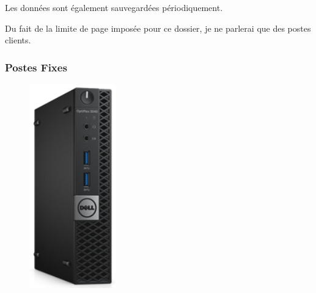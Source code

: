 \documentclass[11pt,a4paper,oneside]{article}
\begin{document}
Les données sont également sauvegardées périodiquement.
    
Du fait de la limite de page imposée pour ce dossier, je ne parlerai que des postes clients.
\newpage

\subsubsection{Postes Fixes}
\begin{figure}
\includegraphics[scale=0.4]{Ressources/Materiel/3040.png}\vspace{-2cm}
\end{figure}
\end{document}
